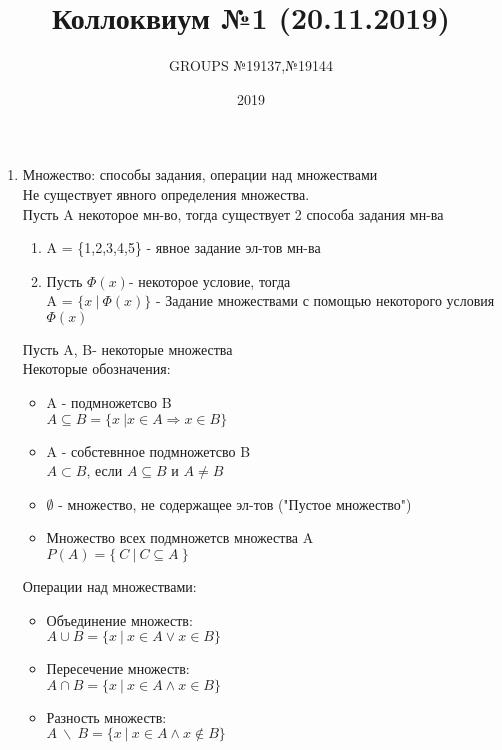 \documentclass{article}
\title{ Коллоквиум №1 (20.11.2019) }
\author{GROUPS №19137,№19144}
\date{2019\\}
\begin{document}
  \maketitle
  \begin{enumerate}
    \item Множество: способы задания, операции над множествами
    \\ Не существует явного определения множества.
    \\ Пусть A некоторое мн-во, тогда существует 2 способа задания мн-ва
          \begin{enumerate}
          \item A = \{1,2,3,4,5\} - явное задание эл-тов мн-ва \\
          \item Пусть $\Phi(x)$- некоторое условие, тогда \\A = $\{x \ | \ \Phi(x) \}$ - Задание множествами с помощью некоторого условия $\Phi(x)$
          \end{enumerate}
      Пусть A, B- некоторые множества \\
      Некоторые обозначения:
      \begin{itemize}
          \item A - подмножетсво B \\
          $A \subseteq B = \{x \ | x\in{A} \Rightarrow x\in{B} \}$
          \item A - собстевнное подмножетсво B \\
          $A \subset B$, если $A \subseteq B$ и $A\ne{B} $
          \item $\emptyset$ - множество, не содержащее эл-тов ("Пустое множество")
          \item Множество всех подмножетсв множества A
          \\ $P(A) = \{ \ C\ |\ C \subseteq{A} \ \} $

      \end{itemize}
      Операции над множествами:
      \begin{itemize}
        \item Объединение множеств:
        \\ $A\cup{B} = \{ x \ | \ x \in{A} \lor x\in{B}\}$
        \item Пересечение множеств:
        \\ $A\cap{B} = \{ x \ | \ x \in{A} \land x\in{B}\}$
        \item Разность множеств:
        \\ $A \ \backslash\  B = \{x\ | \ x\in{A} \land x\notin{B} \}$
      \end{itemize}
  \end{enumerate}
\end{document}
